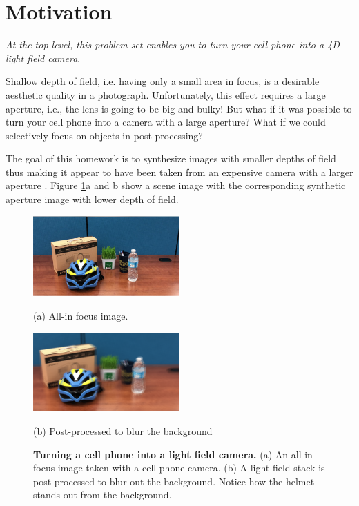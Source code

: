 \documentclass[answers]{exam}
\begin{document}
\newpage

\section{Motivation}
 \emph{At the top-level, this problem set enables you to turn your cell phone into a 4D light field camera}. 
 
Shallow depth of field, i.e. having only a small area in focus, is a desirable aesthetic quality in a photograph. Unfortunately, this effect requires a large aperture, i.e., the lens is going to be big and bulky! But what if it was possible to turn your cell phone into a camera with a large aperture? What if we could selectively focus on objects in post-processing?

The goal of this homework is to synthesize images with smaller depths of field thus making it appear to have been taken from an expensive camera with a larger
aperture\cite{Lumsdaine09thefocused} \cite{Levoy}. Figure \ref{pset_motivation}a and b show a scene image with the corresponding synthetic aperture image with lower depth of field. 

\begin{figure}[h]
\begin{multicols}{2}

	\captionsetup{justification=centering}
    \includegraphics[width=0.5\textwidth]{pset_scene.png} \caption*{(a) All-in focus image.}\par 
    \captionsetup{justification=centering}
    \includegraphics[width=0.5\textwidth]{pset_output_2.png} \caption*{(b) Post-processed to blur the background}\par 
    \end{multicols}
    \caption{\textbf{Turning a cell phone into a light field camera.} (a) An all-in focus image taken with a cell phone camera. (b) A light field stack is post-processed to blur out the background. Notice how the helmet stands out from the background.}
    \label{pset_motivation}
\end{figure}
\end{document}
